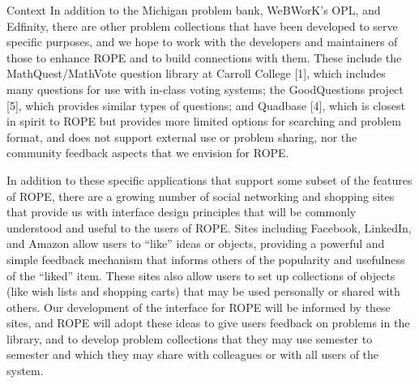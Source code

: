 \documentclass[11pt]{article}
\begin{document}
\begin{section}{Context}
In addition to the Michigan problem bank, WeBWorK's OPL, and Edfinity, there are
other problem collections that have been developed to serve specific
purposes, and we hope to work with the developers and maintainers of those
to enhance ROPE and to build connections with them.  These include the
MathQuest/MathVote question library at Carroll College [1], %
which includes many questions for use with in-class voting systems; the
GoodQuestions project [5], %
which provides similar types of
questions; and Quadbase [4], %
which is closest in spirit to ROPE but provides more limited options for 
searching and problem format,
and does not support external use or problem sharing, nor the
community feedback aspects that we envision for ROPE.  

In addition to these specific applications that support some subset of
the features of ROPE, there are a growing number of social networking
and shopping sites that provide us with interface design principles that
will be commonly understood and useful to the users of ROPE.  Sites
including Facebook, LinkedIn, and Amazon allow users to ``like'' ideas or
objects, providing a powerful and simple feedback mechanism that informs
others of the popularity and usefulness of the ``liked'' item.  These
sites also allow users to set up collections of objects (like wish lists
and shopping carts) that may be used personally or shared with others.
Our development of the interface for ROPE will be informed by these
sites, and ROPE will adopt these ideas to give users feedback on
problems in the library, and to develop problem collections that they may
use semester to semester and which they may share with colleagues or with
all users of the system.


\end{section}
\end{document}
